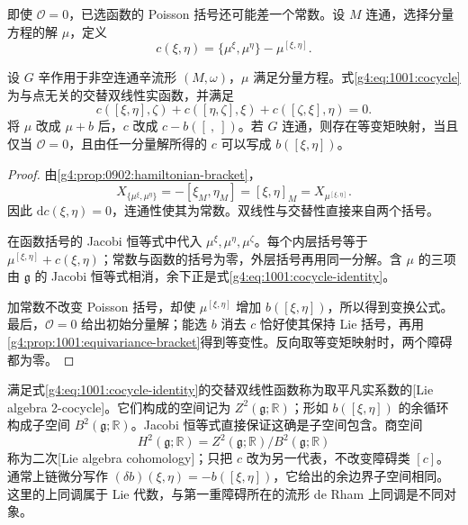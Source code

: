即使 \(\mathcal O=0\)，已选函数的 Poisson 括号还可能差一个常数。设 \(M\) 连通，选择分量方程的解 \(\mu\)，定义
\begin{equation}\label{g4:eq:1001:cocycle}
	c(\xi,\eta)=\{\mu^\xi,\mu^\eta\}-\mu^{[\xi,\eta]}.
\end{equation}

\begin{proposition}\label{g4:prop:1001:lie-cocycle}
	设 \(G\) 辛作用于非空连通辛流形 \((M,\omega)\)，\(\mu\) 满足分量方程。式\eqref{g4:eq:1001:cocycle}为与点无关的交替双线性实函数，并满足
	\begin{equation}\label{g4:eq:1001:cocycle-identity}
		c([\xi,\eta],\zeta)+c([\eta,\zeta],\xi)+c([\zeta,\xi],\eta)=0.
	\end{equation}
	将 \(\mu\) 改成 \(\mu+b\) 后，\(c\) 改成 \(c-b([\ ,\ ])\)。若 \(G\) 连通，则存在等变矩映射，当且仅当 \(\mathcal O=0\)，且由任一分量解所得的 \(c\) 可以写成 \(b([\xi,\eta])\)。
\end{proposition}
\begin{proof}
	由\cref{g4:prop:0902:hamiltonian-bracket}，
	\[
		X_{\{\mu^\xi,\mu^\eta\}}
		=-[\xi_M,\eta_M]=[\xi,\eta]_M
		=X_{\mu^{[\xi,\eta]}}.
	\]
	因此 \(\mathrm{d}c(\xi,\eta)=0\)，连通性使其为常数。双线性与交替性直接来自两个括号。

	在函数括号的 Jacobi 恒等式中代入 \(\mu^\xi,\mu^\eta,\mu^\zeta\)。每个内层括号等于 \(\mu^{[\xi,\eta]}+c(\xi,\eta)\)；常数与函数的括号为零，外层括号再用同一分解。含 \(\mu\) 的三项由 \(\mathfrak g\) 的 Jacobi 恒等式相消，余下正是式\eqref{g4:eq:1001:cocycle-identity}。

	加常数不改变 Poisson 括号，却使 \(\mu^{[\xi,\eta]}\) 增加 \(b([\xi,\eta])\)，所以得到变换公式。最后，\(\mathcal O=0\) 给出初始分量解；能选 \(b\) 消去 \(c\) 恰好使其保持 Lie 括号，再用\cref{g4:prop:1001:equivariance-bracket}得到等变性。反向取等变矩映射时，两个障碍都为零。
\end{proof}

满足式\eqref{g4:eq:1001:cocycle-identity}的交替双线性函数称为取平凡实系数的[Lie algebra 2-cocycle]。它们构成的空间记为 \(Z^2(\mathfrak g;\mathbb R)\)；形如 \(b([\xi,\eta])\) 的余循环构成子空间 \(B^2(\mathfrak g;\mathbb R)\)。Jacobi 恒等式直接保证这确是子空间包含。商空间
\[
	H^2(\mathfrak g;\mathbb R)=Z^2(\mathfrak g;\mathbb R)/B^2(\mathfrak g;\mathbb R)
\]
称为二次[Lie algebra cohomology]；只把 \(c\) 改为另一代表，不改变障碍类 \([c]\)。通常上链微分写作 \((\delta b)(\xi,\eta)=-b([\xi,\eta])\)，它给出的余边界子空间相同。这里的上同调属于 Lie 代数，与第一重障碍所在的流形 de Rham 上同调是不同对象。\cite[第5.6节，第156--157页]{Cannas2006Symplectic}

